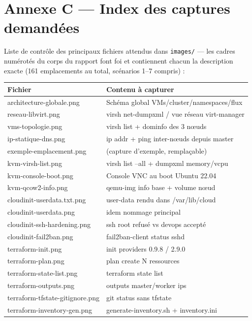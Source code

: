 \documentclass[12pt,a4paper]{article}
\begin{document}
\section*{Annexe C --- Index des captures demandées}

Liste de contrôle des principaux fichiers attendus dans \texttt{images/} --- les cadres numérotés du corps du rapport font foi et contiennent chacun la description exacte (161 emplacements au total, scénarios 1--7 compris) :

{\footnotesize
\begin{longtable}{@{}p{5.6cm}p{9.4cm}@{}}
\toprule
\textbf{Fichier} & \textbf{Contenu à capturer} \\
\midrule
\endhead
architecture-globale.png & Schéma global VMs/cluster/namespaces/flux \\
reseau-libvirt.png & virsh net-dumpxml / vue réseau virt-manager \\
vms-topologie.png & virsh list + dominfo des 3 nœuds \\
ip-statique-dns.png & ip addr + ping inter-nœuds depuis master \\
exemple-emplacement.png & (capture d'exemple, remplaçable) \\
kvm-virsh-list.png & virsh list --all + dumpxml memory/vcpu \\
kvm-console-boot.png & Console VNC au boot Ubuntu 22.04 \\
kvm-qcow2-info.png & qemu-img info base + volume nœud \\
cloudinit-userdata.txt.png & user-data rendu dans /var/lib/cloud \\
cloudinit-userdata.png & idem nommage principal \\
cloudinit-ssh-hardening.png & ssh root refusé vs devops accepté \\
cloudinit-fail2ban.png & fail2ban-client status sshd \\
terraform-init.png & init providers 0.9.8 / 2.9.0 \\
terraform-plan.png & plan create N ressources \\
terraform-state-list.png & terraform state list \\
terraform-outputs.png & outputs master/worker ips \\
terraform-tfstate-gitignore.png & git status sans tfstate \\
terraform-inventory-gen.png & generate-inventory.sh + inventory.ini \\

\end{longtable}}
\end{document}
